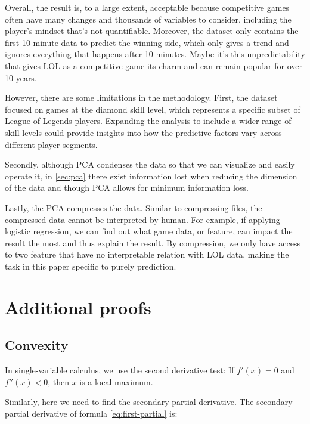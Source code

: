 \documentclass[stu,12pt,floatsintext]{apa7}
\begin{document}
Overall, the result is, to a large extent, acceptable because competitive games often have many changes and thousands of variables to consider, including the player's mindset that's not quantifiable. Moreover, the dataset only contains the first 10 minute data to predict the winning side, which only gives a trend and ignores everything that happens after 10 minutes. Maybe it's this unpredictability that gives LOL as a competitive game its charm and can remain popular for over 10 years.

However, there are some limitations in the methodology. First, the dataset focused on games at the diamond skill level, which represents a specific subset of League of Legends players. Expanding the analysis to include a wider range of skill levels could provide insights into how the predictive factors vary across different player segments.

Secondly, although PCA condenses the data so that we can visualize and easily operate it, in \ref{sec:pca} there exist information lost when reducing the dimension of the data and though PCA allows for minimum information loss. 

Lastly, the PCA compresses the data. Similar to compressing files, the compressed data cannot be interpreted by human. For example, if applying logistic regression, we can find out what game data, or feature, can impact the result the most and thus explain the result. By compression, we only have access to two feature that have no interpretable relation with LOL data, making the task in this paper specific to purely prediction. 


\printbibliography

\appendix

\section{Additional proofs}

\subsection{Convexity}

\label{sec:convexity}

In single-variable calculus, we use the second derivative test: If $f'(x) = 0$ and $f''(x) < 0$, then $x$ is a local maximum.

Similarly, here we need to find the secondary partial derivative. The secondary partial derivative of formula \ref{eq:first-partial} is:
\end{document}
